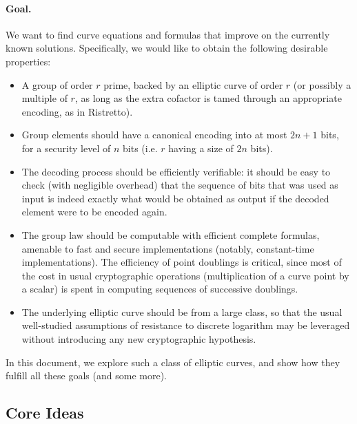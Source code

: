 \documentclass{llncs}
\begin{document}
\paragraph{Goal.} We want to find curve equations and formulas that
improve on the currently known solutions. Specifically, we would like
to obtain the following desirable properties:
\begin{itemize}

    \item A group of order $r$ prime, backed by an elliptic curve of
    order $r$ (or possibly a multiple of $r$, as long as the extra
    cofactor is tamed through an appropriate encoding, as in Ristretto).

    \item Group elements should have a canonical encoding into at most
    $2n+1$ bits, for a security level of $n$ bits (i.e. $r$ having a
    size of $2n$ bits).

    \item The decoding process should be efficiently verifiable: it
    should be easy to check (with negligible overhead) that the sequence
    of bits that was used as input is indeed exactly what would be
    obtained as output if the decoded element were to be encoded again.

    \item The group law should be computable with efficient complete
    formulas, amenable to fast and secure implementations (notably,
    constant-time implementations). The efficiency of point doublings is
    critical, since most of the cost in usual cryptographic operations
    (multiplication of a curve point by a scalar) is spent in computing
    sequences of successive doublings.

    \item The underlying elliptic curve should be from a large class, so
    that the usual well-studied assumptions of resistance to discrete
    logarithm may be leveraged without introducing any new cryptographic
    hypothesis.

\end{itemize}

In this document, we explore such a class of elliptic curves, and show
how they fulfill all these goals (and some more).

\subsection{Core Ideas}
\end{document}
